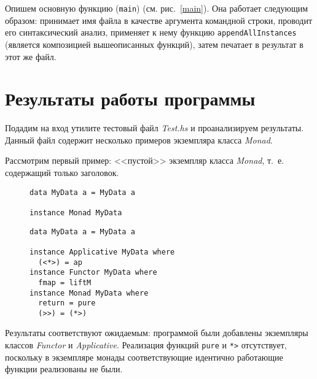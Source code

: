 Опишем основную функцию (\lstinline{main}) (см. рис.~\ref{main}). Она работает следующим образом: принимает имя файла в качестве аргумента командной строки, проводит его синтаксический анализ, применяет к нему функцию \lstinline{appendAllInstances} (является композицией вышеописанных функций), затем печатает в результат в этот же файл.


\newpage
\section{Результаты работы программы}
Подадим на вход утилите тестовый файл \textit{Test.hs} и проанализируем результаты. Данный файл содержит несколько примеров экземпляра класса \textit{Monad}.

Рассмотрим первый пример: <<пустой>> экземпляр класса \textit{Monad}, т.~е. содержащий только заголовок.
\begin{figure}[H]
\begin{parcolumns}{2}
\end{parcolumns}

\begin{minipage}{.45\textwidth}
\begin{lstlisting}
data MyData a = MyData a

instance Monad MyData
\end{lstlisting}
\end{minipage}
\begin{minipage}{.45\textwidth}
\begin{lstlisting}
data MyData a = MyData a

instance Applicative MyData where
  (<*>) = ap  
instance Functor MyData where
  fmap = liftM  
instance Monad MyData where
  return = pure
  (>>) = (*>)
\end{lstlisting}
\end{minipage}
\end{figure}
Результаты соответствуют ожидаемым: программой были добавлены экземпляры классов \textit{Functor} и \textit{Applicative}. Реализация функций \lstinline{pure} и \lstinline{*>} отсутствует, поскольку в экземпляре монады соответствующие идентично работающие функции реализованы не были.

